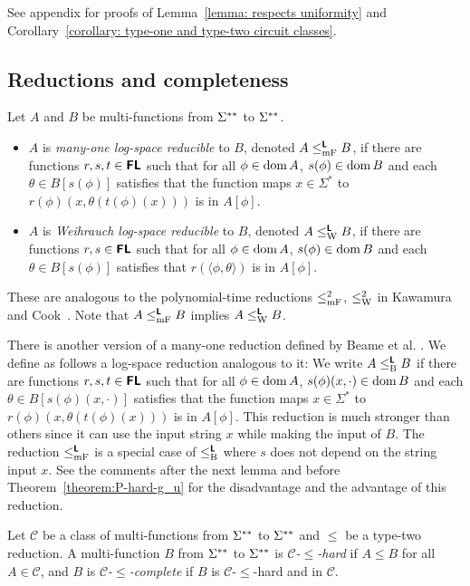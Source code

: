 \documentclass[envcountsame,orivec,oribibl]{llncs}
\begin{document}
See appendix for proofs of 
Lemma~\ref{lemma: respects uniformity} and 
Corollary~\ref{corollary: type-one and type-two circuit classes}.

\subsection{Reductions and completeness}

\begin{definition}
Let $A$ and $B$ be multi-functions from $\Sigma ^{**}$ to $\Sigma ^{**}$.
\begin{itemize}
 \item $A$ is \emph{many-one log-space reducible} to $B$, 
       denoted $A \leq _{\mathrm{mF}} ^{\text{\bfseries \sffamily \upshape L}} B$,
       if there are functions $r, s, t \in \text{\bfseries \sffamily \upshape FL}$ such that 
       for all $\phi \in \mathop{\rm dom} A$,
       $s(\phi) \in \mathop{\rm dom} B$ and each $\theta \in B[s(\phi)]$ satisfies that
       the function maps $x \in \Sigma^*$ to $r(\phi)(x, \theta(t(\phi)(x)))$
       is in $A[\phi]$.
 \item $A$ is \emph{Weihrauch log-space reducible} to $B$,
       denoted $A \leq _{\mathrm W} ^{\text{\bfseries \sffamily \upshape L}} B$,
       if there are functions $r, s \in \text{\bfseries \sffamily \upshape FL}$ such that 
       for all $\phi \in \mathop{\rm dom} A$,
       $s(\phi) \in \mathop{\rm dom} B$ and each $\theta \in B[s(\phi)]$ satisfies that
       $r(\langle \phi, \theta \rangle)$ is in $A[\phi]$.
\end{itemize}
\end{definition}

These are analogous to the polynomial-time reductions 
$\leq _{\mathrm{mF}}^2$, $\leq _{\mathrm W}^2$ in Kawamura and Cook~\cite{kawamura2012complexity}.
Note that $A \leq _{\mathrm{mF}} ^{\text{\bfseries \sffamily \upshape L}} B$ implies $A \leq _{\mathrm W} ^{\text{\bfseries \sffamily \upshape L}} B$.

There is another version of a many-one reduction defined by
Beame et al. \cite{beame1995relative}.
We define as follows a log-space reduction analogous to it:
We write $A \leq _{\mathrm B} ^{\text{\bfseries \sffamily \upshape L}} B$ 
if there are functions $r, s, t \in \text{\bfseries \sffamily \upshape FL}$ such that 
for all $\phi \in \mathop{\rm dom} A$,
$s(\phi)(x, \cdot) \in \mathop{\rm dom} B$ and each $\theta \in B[s(\phi)(x, \cdot)]$ 
satisfies that the function maps $x \in \Sigma^*$ 
to $r(\phi)(x, \theta(t(\phi)(x)))$ is in $A[\phi]$.
This reduction is much stronger than others since
it can use the input string $x$ while making the input of $B$.
The reduction $\leq _{\mathrm{mF}} ^{\text{\bfseries \sffamily \upshape L}}$ is a special case of $\leq _{\mathrm B} ^{\text{\bfseries \sffamily \upshape L}}$ where
$s$ does not depend on the string input $x$.
See the comments after the next lemma and before Theorem~\ref{theorem:P-hard-g_u} for
the disadvantage and the advantage of this reduction.

Let $\mathcal{C}$ be a class of multi-functions from $\Sigma ^{**}$ to $\Sigma ^{**}$
and $\leq$ be a type-two reduction.
A multi-function $B$ from $\Sigma ^{**}$ to $\Sigma ^{**}$ is \emph{$\mathcal{C}$-$\leq$-hard} if $A \leq B$ for all $A \in \mathcal{C}$,
and $B$ is \emph{$\mathcal{C}$-$\leq$-complete} 
if $B$ is $\mathcal{C}$-$\leq$-hard and in $\mathcal{C}$.
\end{document}
